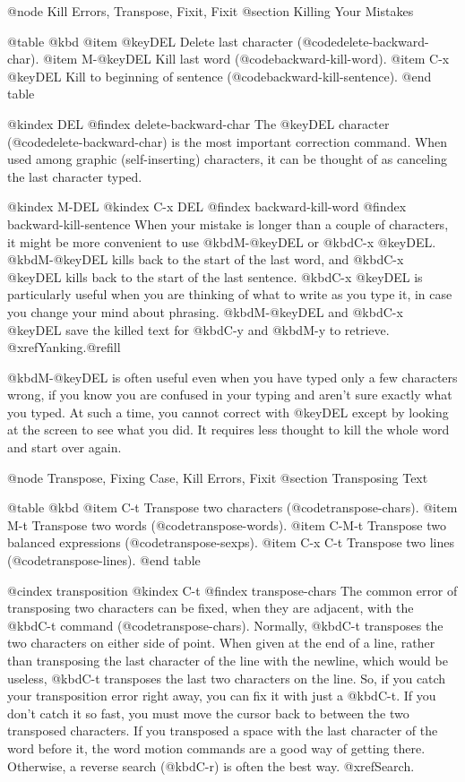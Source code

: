 {{{{{{{{{{{{{{{{{{{{@node Kill Errors, Transpose, Fixit, Fixit
@section Killing Your Mistakes

@table @kbd
@item @key{DEL}
Delete last character (@code{delete-backward-char}).
@item M-@key{DEL}
Kill last word (@code{backward-kill-word}).
@item C-x @key{DEL}
Kill to beginning of sentence (@code{backward-kill-sentence}).
@end table

@kindex DEL
@findex delete-backward-char
  The @key{DEL} character (@code{delete-backward-char}) is the most
important correction command.  When used among graphic (self-inserting)
characters, it can be thought of as canceling the last character typed.

@kindex M-DEL
@kindex C-x DEL
@findex backward-kill-word
@findex backward-kill-sentence
  When your mistake is longer than a couple of characters, it might be more
convenient to use @kbd{M-@key{DEL}} or @kbd{C-x @key{DEL}}.
@kbd{M-@key{DEL}} kills back to the start of the last word, and @kbd{C-x
@key{DEL}} kills back to the start of the last sentence.  @kbd{C-x
@key{DEL}} is particularly useful when you are thinking of what to write as
you type it, in case you change your mind about phrasing.
@kbd{M-@key{DEL}} and @kbd{C-x @key{DEL}} save the killed text for
@kbd{C-y} and @kbd{M-y} to retrieve.  @xref{Yanking}.@refill

  @kbd{M-@key{DEL}} is often useful even when you have typed only a few
characters wrong, if you know you are confused in your typing and aren't
sure exactly what you typed.  At such a time, you cannot correct with
@key{DEL} except by looking at the screen to see what you did.  It requires
less thought to kill the whole word and start over again.

@node Transpose, Fixing Case, Kill Errors, Fixit
@section Transposing Text

@table @kbd
@item C-t
Transpose two characters (@code{transpose-chars}).
@item M-t
Transpose two words (@code{transpose-words}).
@item C-M-t
Transpose two balanced expressions (@code{transpose-sexps}).
@item C-x C-t
Transpose two lines (@code{transpose-lines}).
@end table

@cindex transposition
@kindex C-t
@findex transpose-chars
  The common error of transposing two characters can be fixed, when they
are adjacent, with the @kbd{C-t} command (@code{transpose-chars}).  Normally,
@kbd{C-t} transposes the two characters on either side of point.  When
given at the end of a line, rather than transposing the last character of
the line with the newline, which would be useless, @kbd{C-t} transposes the
last two characters on the line.  So, if you catch your transposition error
right away, you can fix it with just a @kbd{C-t}.  If you don't catch it so
fast, you must move the cursor back to between the two transposed
characters.  If you transposed a space with the last character of the word
before it, the word motion commands are a good way of getting there.
Otherwise, a reverse search (@kbd{C-r}) is often the best way.
@xref{Search}.


}}}}}}}}}}}}}}}}}}}}
